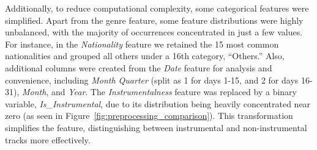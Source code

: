 \documentclass{article}
\begin{document}
Additionally, to reduce computational complexity, some categorical features were simplified. 
Apart from the genre feature, some feature distributions were highly unbalanced, with the majority of occurrences concentrated in just a few values. For instance, in the \textit{Nationality} feature we retained the 15 most common nationalities and grouped all others under a 16th category, ``Others.'' Also, additional columns were created from the \textit{Date} feature for analysis and convenience, including \textit{Month Quarter} (split as 1 for days 1-15, and 2 for days 16-31), \textit{Month}, and \textit{Year}.
The \textit{Instrumentalness} feature was replaced by a binary variable, \textit{Is\_Instrumental}, due to its distribution being heavily concentrated near zero (as seen in Figure~\ref{fig:preprocessing_comparison}). This transformation simplifies the feature, distinguishing between instrumental and non-instrumental tracks more effectively.
\end{document}

